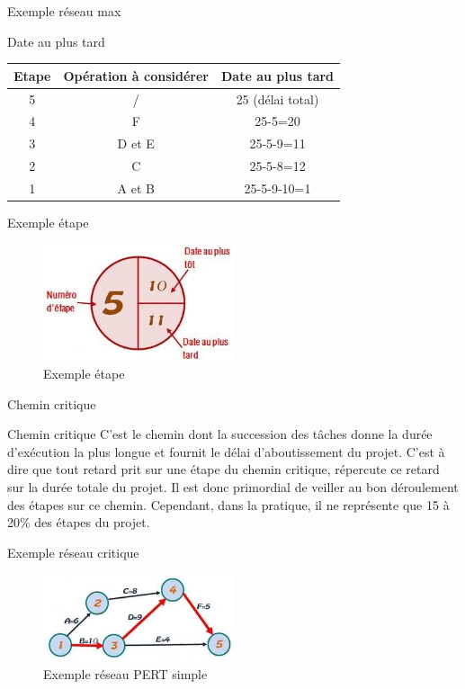 \documentclass{beamer}
\begin{document}
\begin{frame}{Exemple réseau max}
\begin{block}{Date au plus tard}
\centering
\begin{tabular}{|c|c|c|}
\hline
    Etape & Opération à considérer & Date au plus tard \\
    \hline
    5 & / & 25 (délai total) \\
    \hline
    4 & F & 25-5=20 \\
    \hline
    3 & D et E & 25-5-9=11 \\
    \hline
    2 & C & 25-5-8=12 \\
    \hline
    1 & A et B & 25-5-9-10=1 \\
    \hline
\end{tabular}
\end{block}
\end{frame}

\begin{frame}{Exemple étape}
\begin{figure}
      \centering
      \includegraphics[width=0.5\textwidth]{etape2}
      \caption{ Exemple étape}
\end{figure}
\end{frame}

\begin{frame}{Chemin critique}
\begin{block}{Chemin critique}
C’est le chemin dont la succession des tâches donne la durée d’exécution la plus longue et fournit le délai d'aboutissement du projet. C'est à dire que tout retard prit sur une étape du chemin critique, répercute ce retard sur la durée totale du projet. Il est donc primordial de veiller au bon déroulement des étapes sur ce chemin. Cependant, dans la pratique, il ne représente que 15 à 20\% des étapes du projet.
\end{block}
\end{frame}

\begin{frame}{Exemple réseau critique}
\begin{figure}
      \centering
      \includegraphics[width=0.5\textwidth]{chemin_critique}
      \caption{ Exemple réseau PERT simple}
\end{figure}
\end{frame}
\end{document}
